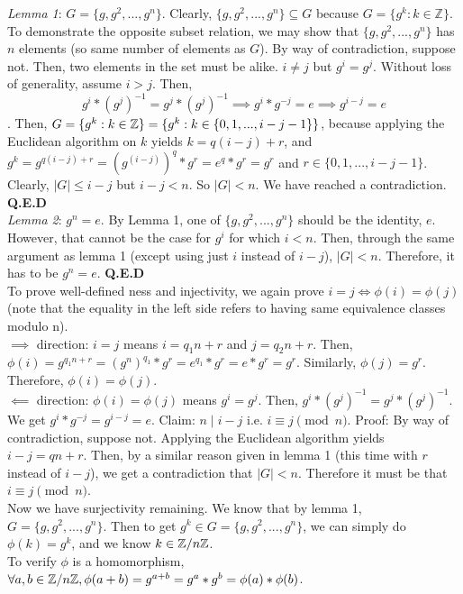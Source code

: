 \documentclass{amsart}
\begin{document}
\begin{enumerate}[itemsep=0.4in]
\emph{Lemma 1}: $G=\{g,g^2,...,g^n\}$. Clearly, $\{g,g^2,...,g^n\}\subseteq G$ because $G=\{g^k:k\in\mathbb{Z}\}$. To demonstrate the opposite subset relation, we may show that $\{g,g^2,...,g^n\}$ has $n$ elements (so same number of elements as $G$). By way of contradiction, suppose not. Then, two elements in the set must be alike. $i\neq j$ but $g^i=g^j$. Without loss of generality, assume $i>j$. 
Then, $$g^i*(g^j)^{-1}=g^j*(g^j)^{-1}\implies g^i*g^{-j}=e\implies g^{i-j}=e$$. Then, $G=\{g^k:k\in\mathbb{Z}\}=\{g^k:k\in\{0,1,...,i-j-1\}\}$, because applying the Euclidean algorithm on $k$ yields $k=q(i-j)+r$, and $g^k=g^{q(i-j)+r}=(g^{(i-j)})^q*g^r=e^q*g^r=g^r$ and $r\in\{0,1,...,i-j-1\}$. Clearly, $|G|\leq i-j$ but $i-j<n$. So $|G|<n$. We have reached a contradiction. \textbf{Q.E.D}\\

\emph{Lemma 2}: $g^n=e$. By Lemma 1, one of $\{g,g^2,...,g^n\}$ should be the identity, $e$. However, that cannot be the case for $g^i$ for which $i<n$. Then, through the same argument as lemma 1 (except using just $i$ instead of $i-j$), $|G|<n$. Therefore, it has to be $g^n=e$. \textbf{Q.E.D}\\

To prove well-defined ness and injectivity, we again prove $i=j\iff\phi(i)=\phi(j)$ (note that the equality in the left side refers to having same equivalence classes modulo n).\\
$\implies$ direction: $i=j$ means $i=q_1n+r$ and $j=q_2n+r$. Then, $\phi(i)=g^{q_1n+r}=(g^n)^{q_1}*g^r=e^{q_1}*g^r=e*g^r=g^r$. Similarly, $\phi(j)=g^r$. Therefore, $\phi(i)=\phi(j)$.\\
$\impliedby$ direction: $\phi(i)=\phi(j)$ means $g^i=g^j$. Then, $g^i*(g^j)^{-1}=g^j*(g^j)^{-1}$. We get $g^i*g^{-j}=g^{i-j}=e$. Claim: $n\mid i-j$ i.e. $i\equiv j\pmod n$.
Proof: By way of contradiction, suppose not. Applying the Euclidean algorithm yields $i-j=qn+r$. Then, by a similar reason given in lemma 1 (this time with $r$ instead of $i-j$), we get a contradiction that $|G|<n$. Therefore it must be that $i\equiv j\pmod n$.\\

Now we have surjectivity remaining. We know that by lemma 1, $G=\{g,g^2,...,g^n\}$. Then to get $g^k\in G=\{g,g^2,...,g^n\}$, we can simply do $\phi(k)=g^k$, and we know $k\in\mathbb{Z}/n\mathbb{Z}$.\\

To verify $\phi$ is a homomorphism, $\forall a,b\in\mathbb{Z}/n\mathbb{Z},\phi(a+b)=g^{a+b}=g^a*g^b=\phi(a)*\phi(b)$. \\


\end{enumerate}
\end{document}

